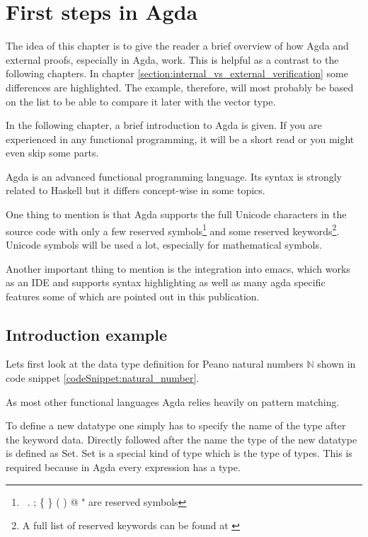 \section{First steps in Agda}\label{section:first_steps_in_agda}
The idea of this chapter is to give the reader a brief overview of how Agda and external proofs, especially in Agda, work. This is helpful as a contrast to the following chapters. 
In chapter \ref{section:internal_vs_external_verification} some differences are highlighted. The example, therefore, will most probably be based on the list to be able to compare it later with the vector type.

In the following chapter, a brief introduction to Agda is given. If you are experienced in any functional programming, it will be a short read or you might even skip some parts.

Agda is an advanced functional programming language. Its syntax is strongly related to Haskell but it differs concept-wise in some topics. 

One thing to mention is that Agda supports the full Unicode characters in the source code with only a few reserved symbols\footnote{\, . ; \{ \} ( ) @ " are reserved symbols\cite{AgdaReadTheDocsStructure}} 
and some reserved keywords\footnote{A full list of reserved keywords can be found at \cite{AgdaReadTheDocsStructure}}. 
Unicode symbols will be used a lot, especially for mathematical symbols.

Another important thing to mention is the integration into emacs, which works as an IDE and supports syntax highlighting as well as many agda specific features some of which are pointed out in this publication.

\subsection{Introduction example}\label{section:agda_introduction_example}
Lets first look at the data type definition for Peano natural numbers $\mathbb{N}$ shown in code snippet \ref{codeSnippet:natural_number}.

As most other functional languages Agda relies heavily on pattern matching. 

To define a new datatype one simply has to specify the name of the type after the keyword data. 
Directly followed after the name the type of the new datatype is defined as Set. 
Set is a special kind of type which is the type of types. This is required because in Agda every expression has a type. 


